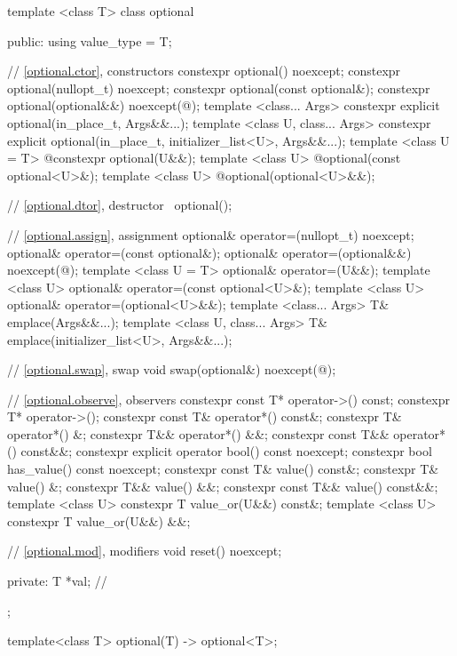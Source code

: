 %
\begin{codeblock}
template <class T>
  class optional {
  public:
    using value_type = T;

    // \ref{optional.ctor}, constructors
    constexpr optional() noexcept;
    constexpr optional(nullopt_t) noexcept;
    constexpr optional(const optional&);
    constexpr optional(optional&&) noexcept(@\seebelow@);
    template <class... Args>
      constexpr explicit optional(in_place_t, Args&&...);
    template <class U, class... Args>
      constexpr explicit optional(in_place_t, initializer_list<U>, Args&&...);
    template <class U = T>
      @\EXPLICIT@ constexpr optional(U&&);
    template <class U>
      @\EXPLICIT@ optional(const optional<U>&);
    template <class U>
      @\EXPLICIT@ optional(optional<U>&&);

    // \ref{optional.dtor}, destructor
    ~optional();

    // \ref{optional.assign}, assignment
    optional& operator=(nullopt_t) noexcept;
    optional& operator=(const optional&);
    optional& operator=(optional&&) noexcept(@\seebelow@);
    template <class U = T> optional& operator=(U&&);
    template <class U> optional& operator=(const optional<U>&);
    template <class U> optional& operator=(optional<U>&&);
    template <class... Args> T& emplace(Args&&...);
    template <class U, class... Args> T& emplace(initializer_list<U>, Args&&...);

    // \ref{optional.swap}, swap
    void swap(optional&) noexcept(@\seebelow@);

    // \ref{optional.observe}, observers
    constexpr const T* operator->() const;
    constexpr T* operator->();
    constexpr const T& operator*() const&;
    constexpr T& operator*() &;
    constexpr T&& operator*() &&;
    constexpr const T&& operator*() const&&;
    constexpr explicit operator bool() const noexcept;
    constexpr bool has_value() const noexcept;
    constexpr const T& value() const&;
    constexpr T& value() &;
    constexpr T&& value() &&;
    constexpr const T&& value() const&&;
    template <class U> constexpr T value_or(U&&) const&;
    template <class U> constexpr T value_or(U&&) &&;

    // \ref{optional.mod}, modifiers
    void reset() noexcept;

  private:
    T *val; // \expos
  };

template<class T> optional(T) -> optional<T>;
\end{codeblock}

